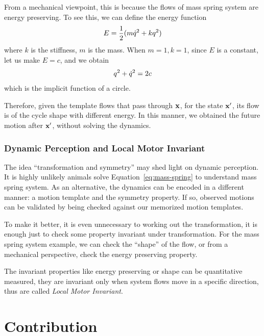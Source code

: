 From a mechanical viewpoint, this is because the flows of mass spring system are energy preserving.
To see this, we can define the energy function
\[
E=\frac{1}{2}(m\dot{q}^2+kq^2)
\]
where $k$ is the stiffness, $m$ is the mass.
When $m=1,k=1$, since $E$ is a constant, let  us make $E=c$,
and  we obtain
\[
 q^2+\dot{q}^2=2c
\]
 which is the implicit function of a circle.

Therefore, given the template flows that pass through  $\mathbf{x}$, for the state $\mathbf{x}'$, its flow is of the cycle shape with different energy.
In this manner, we obtained the future motion after $\mathbf{x}'$, without solving the dynamics.


\subsubsection*{Dynamic Perception and Local Motor Invariant}

The idea ``transformation and symmetry'' may shed light on dynamic perception. 
It is highly unlikely animals solve Equation~\ref{eq:mass-spring} to understand mass spring system.
As an alternative, the dynamics can be encoded in a different manner: a motion template and the symmetry property. 
If so, observed motions can be validated by being checked against our memorized motion templates.

To make it better, it is even unnecessary to working out the transformation, it is enough just to check some property invariant under transformation.
For the mass spring system example, we can check the ``shape'' of the flow, or from a mechanical perspective, check the energy preserving property.

 
The invariant properties like energy preserving or shape can be quantitative measured, they are invariant only when system flows move in a specific direction, thus are called  \emph{Local Motor Invariant}. 


\section{Contribution}

